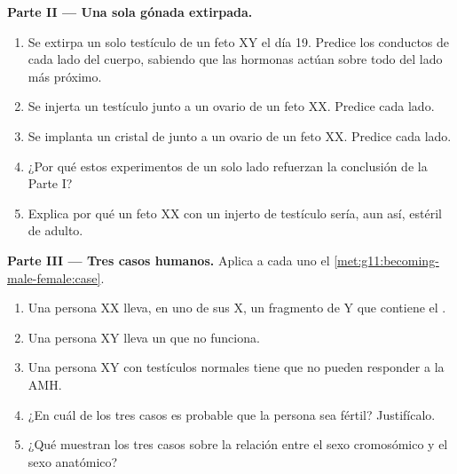 \begin{problem}
\medskip
\noindent\textbf{Parte II --- Una sola gónada extirpada.}
\begin{enumerate}[resume]
  \item Se extirpa un solo testículo de un feto XY el día 19. Predice
        los conductos de cada lado del cuerpo, sabiendo que las
        hormonas actúan sobre todo del lado más próximo.
  \item Se injerta un testículo junto a un ovario de un feto XX.
        Predice cada lado.
  \item Se implanta un cristal de  junto a un ovario de un
        feto XX. Predice cada lado.
  \item ¿Por qué estos experimentos de un solo lado refuerzan la
        conclusión de la Parte I?
  \item Explica por qué un feto XX con un injerto de testículo sería,
        aun así, estéril de adulto.
\end{enumerate}

\medskip
\noindent\textbf{Parte III --- Tres casos humanos.}
Aplica a cada uno el \cref{met:g11:becoming-male-female:case}.
\begin{enumerate}[resume]
  \item Una persona XX lleva, en uno de sus  X, un fragmento
        de Y que contiene el .
  \item Una persona XY lleva un  que no funciona.
  \item Una persona XY con testículos normales tiene  que no
        pueden responder a la AMH.
  \item ¿En cuál de los tres casos es probable que la persona sea
        fértil? Justifícalo.
  \item ¿Qué muestran los tres casos sobre la relación entre el sexo
        cromosómico y el sexo anatómico?
\end{enumerate}


\end{problem}

